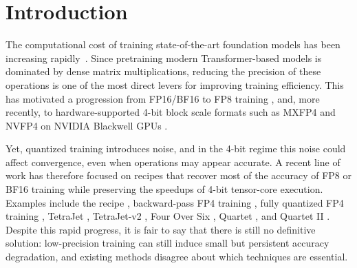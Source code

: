 \section{Introduction}

The computational cost of training state-of-the-art foundation models has been increasing rapidly~\citep{amodei2018ai,sevilla2022compute}. Since pretraining modern Transformer-based models is dominated by dense matrix multiplications, reducing the precision of these operations is one of the most direct levers for improving training efficiency. This has motivated a progression from FP16/BF16 to FP8 training \citep{micikevicius2022fp8}, and, more recently, to hardware-supported 4-bit block scale formats \citep{rouhani2023microscalingdataformatsdeep} such as MXFP4 and NVFP4 on NVIDIA Blackwell GPUs \citep{nvidia2025blackwell, alvarez2025introducingnvfp4, nvidia2025nvfp4}.

Yet, quantized training introduces noise, and in the 4-bit regime this noise could affect convergence, even when operations may appear accurate. A recent line of work has therefore focused on recipes that recover most of the accuracy of FP8 or BF16 training while preserving the speedups of 4-bit tensor-core execution. Examples include the \nvrecipe recipe \citep{nvidia2025pretraining}, backward-pass FP4 training \citep{tseng2025mxfp4}, fully quantized FP4 training \citep{chmiel2025fp4all}, TetraJet \citep{chen2025oscillationreducedmxfp4trainingvision}, TetraJet-v2 \citep{chen2025tetrajet}, Four Over Six \citep{cook2025fouroversix}, Quartet \citep{castro2025quartet}, and Quartet II \citep{panferov2026quartetii}. Despite this rapid progress, it is fair to say that there is still no definitive solution: low-precision training can still induce small but persistent accuracy degradation, and existing methods disagree about which techniques are essential.

